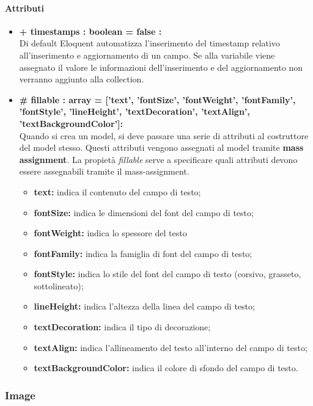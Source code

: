 	\paragraph{Attributi}
	\begin{itemize}
		\item \textbf{+ timestamps : boolean = false :}\\
		Di default Eloquent automatizza l'inserimento del timestamp relativo all'inserimento e aggiornamento di un campo. Se alla variabile viene assegnato il valore le informazioni dell'inserimento e del aggiornamento non verranno aggiunto alla collection.
		\item \textbf{\# fillable : array = [’text’, ’fontSize’, ’fontWeight’, ’fontFamily’, ’fontStyle’, ’lineHeight’, ’textDecoration’, ’textAlign’, ’textBackgroundColor']:}\\
		Quando si crea un model, si deve passare una serie di attributi al costruttore del model stesso. Questi attributi vengono assegnati al model tramite \textbf{mass assignment}. La propietà \textit{fillable} serve a specificare quali attributi devono essere assegnabili tramite il mass-assignment.
		\begin{itemize}
			\item \textbf{text:} indica il contenuto del campo di testo;
			\item \textbf{fontSize:} indica le dimensioni del font del campo di testo;
			\item \textbf{fontWeight:} indica lo spessore del testo
			\item \textbf{fontFamily:} indica la famiglia di font del campo di testo;
			\item \textbf{fontStyle:} indica lo stile del font del campo di testo (corsivo, grasseto, sottolineato);
			\item \textbf{lineHeight:} indica l'altezza della linea del campo di testo;
			\item \textbf{textDecoration:} indica il tipo di decorazione;
			\item \textbf{textAlign:} indica l'allineamento del testo all'interno del campo di testo;
			\item \textbf{textBackgroundColor:} indica il colore di sfondo del campo di testo.
		\end{itemize}
	\end{itemize}
\newpage


\subsubsection{Image}

